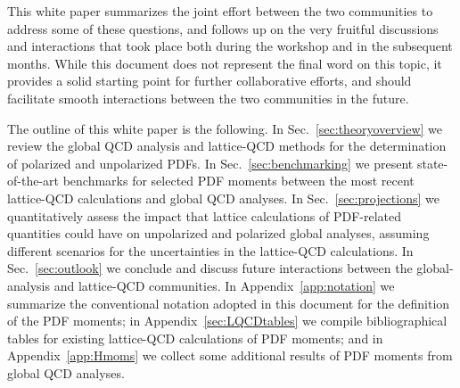 This white paper summarizes the joint effort between the two communities to 
address some of these questions, and follows up on the very fruitful 
discussions and interactions that took place both during 
the workshop and in the subsequent months.
%
While this document does not represent the final word on this topic, it 
provides a solid starting point for further collaborative efforts, and 
should facilitate smooth interactions between the two communities in the future.

The outline of this white paper is the following.
%
In Sec.~\ref{sec:theoryoverview} we review the global QCD analysis and 
lattice-QCD methods for the determination of polarized and unpolarized PDFs.
%
In Sec.~\ref{sec:benchmarking} we present state-of-the-art benchmarks 
for selected PDF moments between the most recent lattice-QCD calculations and 
global QCD analyses.
%
In Sec.~\ref{sec:projections} we quantitatively assess the impact that
lattice calculations of PDF-related quantities could have on unpolarized
and polarized global analyses, assuming different scenarios for the 
uncertainties in the lattice-QCD calculations.
%
In Sec.~\ref{sec:outlook} we conclude
and discuss future interactions between
the global-analysis and lattice-QCD communities.
%
In Appendix~\ref{app:notation} we summarize the conventional notation
adopted in this document for the definition of the PDF moments; 
in Appendix~\ref{sec:LQCDtables} we compile bibliographical tables for
existing lattice-QCD calculations of PDF moments;
and in Appendix~\ref{app:Hmoms} we collect some
additional results of PDF moments from global QCD analyses.

